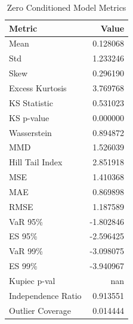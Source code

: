 \begin{table}[htbp]
\centering
\begin{tabular}{lr}
\hline
\textbf{Metric} & \textbf{Value} \\
\hline
Mean & 0.128068 \\
Std & 1.233246 \\
Skew & 0.296190 \\
Excess Kurtosis & 3.769768 \\
\hline
KS Statistic & 0.531023 \\
KS p-value & 0.000000 \\
Wasserstein & 0.894872 \\
MMD & 1.526039 \\
Hill Tail Index & 2.851918 \\
\hline
MSE & 1.410368 \\
MAE & 0.869898 \\
RMSE & 1.187589 \\
\hline
VaR 95\% & -1.802846 \\
ES 95\% & -2.596425 \\
VaR 99\% & -3.098075 \\
ES 99\% & -3.940967 \\
Kupiec p-val & nan \\
Independence Ratio & 0.913551 \\
Outlier Coverage & 0.014444 \\
\hline
\end{tabular}
\caption{Zero Conditioned Model Metrics}
\label{tab:zero_conditioned_metrics}
\end{table}
